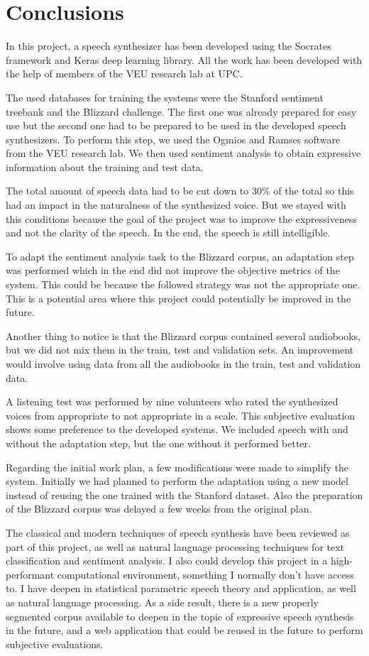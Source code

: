 \chapter{Conclusions}

In this project, a speech synthesizer has been developed using the Socrates framework and Keras deep learning library. All the work has been developed with the help of members of the VEU research lab at UPC.

The used databases for training the systems were the Stanford sentiment treebank and the Blizzard challenge. The first one was already prepared for easy use but the second one had to be prepared to be used in the developed speech synthesizers. To perform this step, we used the Ogmios and Ramses software from the VEU research lab. We then used sentiment analysis to obtain expressive information about the training and test data.

The total amount of speech data had to be cut down to 30\% of the total so this had an impact in the naturalness of the synthesized voice. But we stayed with this conditions because the goal of the project was to improve the expressiveness and not the clarity of the speech. In the end, the speech is still intelligible.

To adapt the sentiment analysis task to the Blizzard corpus, an adaptation step was performed which in the end did not improve the objective metrics of the system. This could be because the followed strategy was not the appropriate one. This is a potential area where this project could potentially be improved in the future.

Another thing to notice is that the Blizzard corpus contained several audiobooks, but we did not mix them in the train, test and validation sets. An improvement would involve using data from all the audiobooks in the train, test and validation data.

A listening test was performed by nine volunteers who rated the synthesized voices from appropriate to not appropriate in a scale. This subjective evaluation shows some preference to the developed systems. We included speech with and without the adaptation step, but the one without it performed better.

Regarding the initial work plan, a few modifications were made to simplify the system. Initially we had planned to perform the adaptation using a new model instead of reusing the one trained with the Stanford dataset. Also the preparation of the Blizzard corpus was delayed a few weeks from the original plan.

The classical and modern techniques of speech synthesis have been reviewed as part of this project, as well as natural language processing techniques for text classification and sentiment analysis. I also could develop this project in a high-performant computational environment, something I normally don't have access to. I have deepen in statistical parametric speech theory and application, as well as natural language processing. As a side result, there is a new properly segmented corpus available to deepen in the topic of expressive speech synthesis in the future, and a web application that could be reused in the future to perform subjective evaluations.
